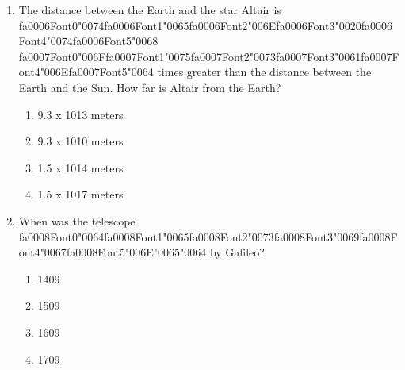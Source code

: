 \documentclass[12pt]{article}
\begin{document}
\begin{enumerate}[label=\arabic*.]
Moon?
\begin{enumerate}[label=(\alph*)]
    \item The Moon split from the Earth due to tidal forces.
    \item The Moon was captured into Earth orbit.
    \item The Earth and Moon co-accreted in the solar nebula.
    \item Earth was rotating so rapidly that the Moon split from it.
\end{enumerate}
\item The distance between the Earth and the star Altair is {\csname fa0006Font0\endcsname\char"0074}{\csname fa0006Font1\endcsname\char"0065}{\csname fa0006Font2\endcsname\char"006E}{\csname fa0006Font3\endcsname\char"0020}{\csname fa0006Font4\endcsname\char"0074}{\csname fa0006Font5\endcsname\char"0068} {\csname fa0007Font0\endcsname\char"006F}{\csname fa0007Font1\endcsname\char"0075}{\csname fa0007Font2\endcsname\char"0073}{\csname fa0007Font3\endcsname\char"0061}{\csname fa0007Font4\endcsname\char"006E}{\csname fa0007Font5\endcsname\char"0064} times greater than the
distance between the Earth and the Sun. How far is Altair from the Earth?
\begin{enumerate}[label=(\alph*)]
    \item 9.3 x 1013 meters
    \item 9.3 x 1010 meters
    \item 1.5 x 1014 meters
    \item 1.5 x 1017 meters
\end{enumerate}
\item When was the telescope {\csname fa0008Font0\endcsname\char"0064}{\csname fa0008Font1\endcsname\char"0065}{\csname fa0008Font2\endcsname\char"0073}{\csname fa0008Font3\endcsname\char"0069}{\csname fa0008Font4\endcsname\char"0067}{\csname fa0008Font5\endcsname\char"006E}{\char"0065}{\char"0064} by Galileo?
\begin{enumerate}[label=(\alph*)]
    \item 1409
    \item 1509
    \item 1609
    \item 1709
\end{enumerate}
\end{enumerate}
\end{document}
